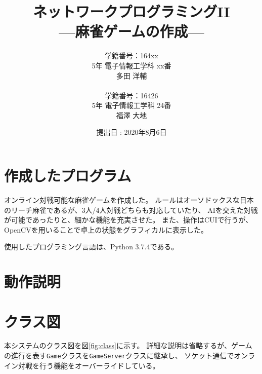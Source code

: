 \documentclass[a4j,titlepage]{jsarticle}
\begin{document}
\begin{titlepage}
  \title{\huge{ネットワークプログラミングI\hspace{-.1em}I} \\ \LARGE{---麻雀ゲームの作成---}}
  \author{
    学籍番号：164xx \\ 5年 電子情報工学科 xx番 \\ 多田 洋輔 \\ \\
    学籍番号：16426 \\ 5年 電子情報工学科 24番 \\ 福澤 大地
  }
	\date{提出日 : 2020年8月6日}
  \maketitle
\end{titlepage}


\section{作成したプログラム}
オンライン対戦可能な麻雀ゲームを作成した。
ルールはオーソドックスな日本のリーチ麻雀であるが、3人/4人対戦どちらも対応していたり、
AIを交えた対戦が可能であったりと、細かな機能を充実させた。
また、操作はCUIで行うが、OpenCVを用いることで卓上の状態をグラフィカルに表示した。

使用したプログラミング言語は、Python 3.7.4である。


\section{動作説明}


\section{クラス図}
本システムのクラス図を図\ref{fig:class}に示す。
詳細な説明は省略するが、ゲームの進行を表す\texttt{Game}クラスを\texttt{GameServer}クラスに継承し、
ソケット通信でオンライン対戦を行う機能をオーバーライドしている。
\end{document}
